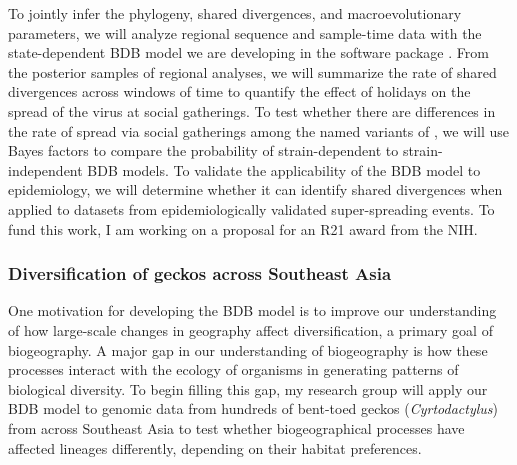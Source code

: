 To jointly infer the \sarscov phylogeny, shared divergences,
and macroevolutionary parameters,
we will analyze regional sequence and sample-time data with the
state-dependent BDB model we are developing in the software package \revbayes.
From the posterior samples of regional analyses, we will summarize the rate of
shared divergences across windows of time to quantify the effect of holidays
on the spread of the virus at social gatherings.
To test whether there are differences in the rate of spread via social
gatherings among the named variants of \sarscov,
we will use Bayes factors to compare the probability of strain-dependent to
strain-independent BDB models.
To validate the applicability of the BDB model to epidemiology,
we will determine whether it can identify shared divergences when applied to
\sarscov datasets from epidemiologically validated super-spreading events.
To fund this work, I am working on a proposal for an R21 award from the NIH.


\subsubsection*{Diversification of geckos across Southeast Asia}
One motivation for developing the BDB model is to improve our understanding of
how large-scale changes in geography affect diversification, a primary goal of
biogeography.
A major gap in our understanding of biogeography is how these processes
interact with the ecology of organisms in generating patterns of biological
diversity.
To begin filling this gap,
my research group will
apply our BDB model to genomic data from
hundreds of bent-toed geckos (\textit{Cyrtodactylus}) from
across Southeast Asia
to test whether
biogeographical processes
have affected lineages differently, depending on their habitat preferences.

